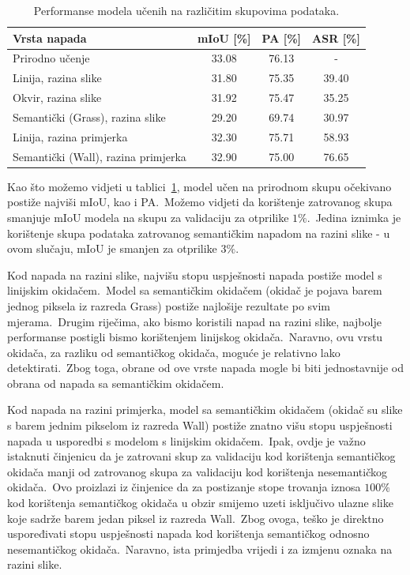 \documentclass[times, utf8, seminar, numeric]{fer}
\begin{document}
\begin{table}[htb]
    \caption{Performanse modela učenih na različitim skupovima podataka.}
    \label{tbl:performanse_zatrovano}
    \centering
    \begin{tabular}{lccc} \hline
    Vrsta napada & mIoU [\%] & PA [\%] & ASR [\%] \\ \hline
    Prirodno učenje & 33.08 & 76.13 & - \\ \hline
    Linija, razina slike & 31.80 & 75.35 & 39.40 \\
    Okvir, razina slike & 31.92 & 75.47 & 35.25 \\
    Semantički (Grass), razina slike & 29.20 & 69.74 & 30.97 \\ \hline
    Linija, razina primjerka & 32.30 & 75.71 & 58.93 \\
    Semantički (Wall), razina primjerka & 32.90 & 75.00 & 76.65 \\ \hline
    \end{tabular}
\end{table}

Kao što možemo vidjeti u tablici~\ref{tbl:performanse_zatrovano}, model učen na prirodnom skupu očekivano postiže najviši mIoU, kao i PA.\ 
Možemo vidjeti da korištenje zatrovanog skupa smanjuje mIoU modela na skupu za validaciju za otprilike $1\%$.\ 
Jedina iznimka je korištenje skupa podataka zatrovanog semantičkim napadom na razini slike - u ovom slučaju, mIoU je smanjen za otprilike $3\%$.\ 
  
Kod napada na razini slike, najvišu stopu uspješnosti napada postiže model s linijskim okidačem.\ 
Model sa semantičkim okidačem (okidač je pojava barem jednog piksela iz razreda Grass) postiže najlošije rezultate po svim mjerama.\ 
Drugim riječima, ako bismo koristili napad na razini slike, najbolje performanse postigli bismo korištenjem linijskog okidača.\ 
Naravno, ovu vrstu okidača, za razliku od semantičkog okidača, moguće je relativno lako detektirati.\ 
Zbog toga, obrane od ove vrste napada mogle bi biti jednostavnije od obrana od napada sa semantičkim okidačem.\ 

Kod napada na razini primjerka, model sa semantičkim okidačem (okidač su slike s barem jednim pikselom iz razreda Wall) postiže znatno višu stopu uspješnosti napada u usporedbi s modelom s linijskim okidačem.\ 
Ipak, ovdje je važno istaknuti činjenicu da je zatrovani skup za validaciju kod korištenja semantičkog okidača manji od zatrovanog skupa za validaciju kod korištenja nesemantičkog okidača.\ 
Ovo proizlazi iz činjenice da za postizanje stope trovanja iznosa $100\%$ kod korištenja semantičkog okidača u obzir smijemo uzeti isključivo ulazne slike koje sadrže barem jedan piksel iz razreda Wall.\ 
Zbog ovoga, teško je direktno uspoređivati stopu uspješnosti napada kod korištenja semantičkog odnosno nesemantičkog okidača.\ 
Naravno, ista primjedba vrijedi i za izmjenu oznaka na razini slike.\ 
\end{document}
